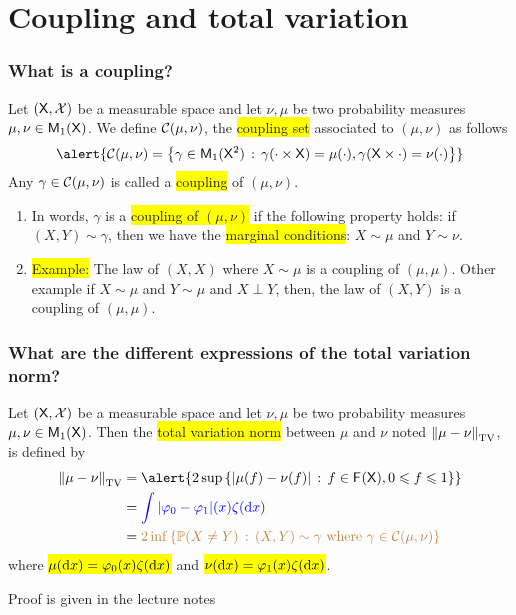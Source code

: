\documentclass[usenames,dvipsnames]{beamer}
\newcommand\mycoltwo[1]{{\color{blue}#1}}
\newcommand\mycolthree[1]{{\color{Emerald}#1}}
\newcommand\colbox[1]{\colorbox{Yellow}{#1}}
\begin{document}
\section{Coupling and total variation}
\begin{frame}
    \frametitle{What is a coupling?}
    \begin{definition}
        Let $(\mathsf{X},\mathcal{X})$ be a measurable space and let $\nu,\mu$ be two probability measures $\mu,\nu \in \mathsf{M}_{1}(\mathsf{X})$. We define $\mathcal{C}(\mu,\nu)$, the \colbox{coupling set} associated to $(\mu,\nu)$ as follows
    $$ 
\alert{    \coupling(\mu,\nu)=\set{\gamma\in\meas 1(\Xset^2)}{\gamma(\cdot\times\Xset)=\mu(\cdot), \gamma(\Xset\times \cdot)=\nu(\cdot)}}     
    $$
       Any $\gamma\in\mathcal{C}(\mu,\nu)$ is called a \colbox{coupling} of $(\mu,\nu)$.
        \end{definition}
        \pause
        \begin{enumerate}
            \item In words, $\gamma$ is a \colbox{coupling of $(\mu,\nu)$} if the following property holds: if $(X,Y) \sim \gamma$, then we have the \colbox{marginal conditions}: $X\sim\mu$ and $Y\sim \nu$. \pause 
            \item \colbox{Example:} The law of \alert{$(X,X)$} where $X\sim \mu$ is a coupling of $(\mu,\mu)$. Other example if $X\sim \mu$ and $Y\sim \mu$ and $X \perp Y$, then, the law of \alert{$(X,Y)$} is a coupling of $(\mu,\mu)$. 
        \end{enumerate}
\end{frame}


\begin{frame}
    \frametitle{What are the different expressions of the total variation norm?}
    \begin{definition} \label{def:totvar}
        Let $(\mathsf{X},\mathcal{X})$ be a measurable space and let $\nu,\mu$ be two probability measures $\mu,\nu \in \mathsf{M}_{1}(\mathsf{X})$. Then the \colbox{total variation norm} between $\mu$ and $\nu$ noted $\left\|\mu-\nu\right\|_{\mathrm{TV}}$, is defined by
        \begin{align}
        \tvnorm{\mu-\nu}&=\alert{2\sup\set{|\mu(f)-\nu(f)|}{f\in \funcset{}(\Xset), 0\leq f\leq 1}} \label{eq:def:totvar:one}\\
                &=\mycoltwo{\int |\varphi_0-\varphi_1|(x) \zeta(\rmd x)} \label{eq:def:totvar:two}\\
                &=\textcolor{brown}{2\inf\set{\PP(X\neq Y) }{ (X,Y) \sim \gamma \mbox{ where } \gamma \in \coupling(\mu,\nu)}} \label{eq:def:totvar:three}
        \end{align}
        where \colbox{$\mu(\mathrm{d} x)=\varphi_0(x) \zeta(\mathrm{d} x)$} and \colbox{$\nu(\mathrm{d} x)=\varphi_1(x) \zeta(\mathrm{d} x)$}.
        \end{definition}
        \mycolthree{Proof is given in the lecture notes}
\end{frame}
\end{document}
